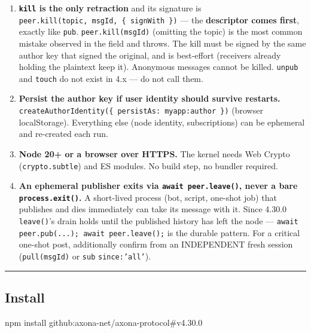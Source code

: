 \documentclass[
  nobib]{tufte-handout}
\newenvironment{Shaded}{}{}
\newcommand{\ExtensionTok}[1]{#1}
\newcommand{\NormalTok}[1]{#1}
\begin{document}
\begin{enumerate}
  ceiling). Re-publishing the identical payload from the same author
  yields the SAME msgId and refreshes the hold (an upsert; subscribers
  are not re-notified). Axona is a live messaging fabric, not permanent
  storage.
\item
  \textbf{\texttt{kill} is the only retraction} and its signature is
  \texttt{peer.kill(topic,\ msgId,\ \{\ signWith\ \})} --- the
  \textbf{descriptor comes first}, exactly like \texttt{pub}.
  \texttt{peer.kill(msgId)} (omitting the topic) is the most common
  mistake observed in the field and throws. The kill must be signed by
  the same author key that signed the original, and is best-effort
  (receivers already holding the plaintext keep it). Anonymous messages
  cannot be killed. \texttt{unpub} and \texttt{touch} do not exist in
  4.x --- do not call them.
\item
  \textbf{Persist the author key if user identity should survive
  restarts.}
  \texttt{createAuthorIdentity(\{\ persistAs:\ \textquotesingle{}myapp:author\textquotesingle{}\ \})}
  (browser localStorage). Everything else (node identity, subscriptions)
  can be ephemeral and re-created each run.
\item
  \textbf{Node 20+ or a browser over HTTPS.} The kernel needs Web Crypto
  (\texttt{crypto.subtle}) and ES modules. No build step, no bundler
  required.
\item
  \textbf{An ephemeral publisher exits via \texttt{await peer.leave()},
  never a bare \texttt{process.exit()}.} A short-lived process (bot,
  script, one-shot job) that publishes and dies immediately can take its
  message with it. Since 4.30.0 \texttt{leave()}'s drain holds until the
  published history has left the node —
  \texttt{await peer.pub(...); await peer.leave();} is the durable
  pattern. For a critical one-shot post, additionally confirm from an
  INDEPENDENT fresh session (\texttt{pull(msgId)} or \texttt{sub}
  \texttt{since:'all'}).
\end{enumerate}

\begin{center}\rule{0.5\linewidth}{0.5pt}\end{center}

\subsection{Install}\label{install}

\begin{Shaded}
\begin{Highlighting}[]
\ExtensionTok{npm}\NormalTok{ install github:axona{-}net/axona{-}protocol\#v4.30.0}
\end{Highlighting}
\end{Shaded}
\end{document}
